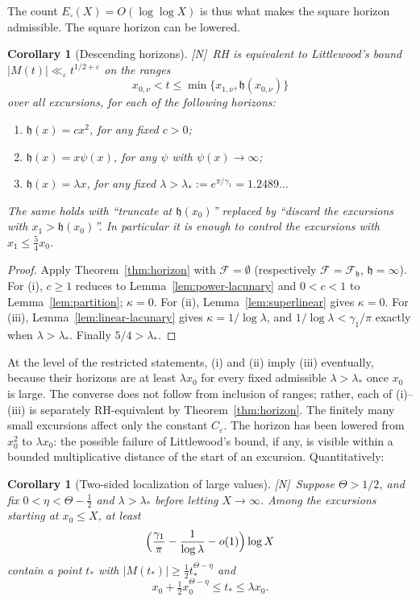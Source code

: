 \documentclass[11pt]{amsart}
\numberwithin{equation}{section}
\theoremstyle{plain}
\newtheorem{corollary}[theorem]{Corollary}
\theoremstyle{definition}
\theoremstyle{remark}
\newcommand{\eps}{\varepsilon}
\newcommand{\F}{\mathcal{F}}
\newcommand{\tagN}{\textup{[N]}}
\begin{document}
The count $E_\square(X)=O(\log\log X)$ is thus what makes the square
horizon admissible. The square horizon can be lowered.

\begin{corollary}[Descending horizons]
\label{cor:descending}
\tagN\ RH is equivalent to Littlewood's bound
$|M(t)|\ll_\eps t^{1/2+\eps}$ on the ranges
\[
x_{0,\nu}<t\le\min\{x_{1,\nu},\mathfrak h(x_{0,\nu})\}
\]
over all excursions, for each of the following horizons:
\begin{enumerate}[label=\textup{(\roman*)}]
\item $\mathfrak h(x)=cx^2$, for any fixed $c>0$;
\item $\mathfrak h(x)=x\psi(x)$, for any $\psi$ with $\psi(x)\to\infty$;
\item $\mathfrak h(x)=\lambda x$, for any fixed $\lambda>\lambda_*:=e^{\pi/\gamma_1}=1.2489\ldots$
\end{enumerate}
The same holds with ``truncate at $\mathfrak h(x_0)$'' replaced by ``discard the
excursions with $x_1>\mathfrak h(x_0)$''. In particular it is enough to control the
excursions with $x_1\le\frac54x_0$.
\end{corollary}

\begin{proof}
Apply Theorem~\ref{thm:horizon} with $\F=\emptyset$ (respectively
$\F=\F_{\mathfrak h}$, $\mathfrak h=\infty$). For (i), $c\ge1$ reduces to
Lemma~\ref{lem:power-lacunary} and $0<c<1$ to Lemma~\ref{lem:partition};
$\kappa=0$. For (ii), Lemma~\ref{lem:superlinear} gives $\kappa=0$. For
(iii), Lemma~\ref{lem:linear-lacunary} gives $\kappa=1/\log\lambda$, and
$1/\log\lambda<\gamma_1/\pi$ exactly when $\lambda>\lambda_*$. Finally
$5/4>\lambda_*$.
\end{proof}

At the level of the restricted statements, (i) and (ii) imply (iii)
eventually, because their horizons are at least $\lambda x_0$ for every
fixed admissible $\lambda>\lambda_*$ once $x_0$ is large.  The converse
does not follow from inclusion of ranges; rather, each of (i)--(iii) is
separately RH-equivalent by Theorem~\ref{thm:horizon}.  The finitely many
small excursions affect only the constant $C_\eps$. The horizon has
been lowered from $x_0^2$ to $\lambda x_0$: the possible failure of
Littlewood's bound, if any, is visible within a bounded multiplicative
distance of the start of an excursion. Quantitatively:

\begin{corollary}[Two-sided localization of large values]
\label{cor:two-sided}
\tagN\ Suppose $\Theta>1/2$, and fix $0<\eta<\Theta-\frac12$ and
$\lambda>\lambda_*$ before letting $X\to\infty$.
Among the excursions starting at $x_0\le X$, at least
\[
\Bigl(\frac{\gamma_1}{\pi}-\frac1{\log\lambda}-o(1)\Bigr)\log X
\]
contain a point $t_*$ with $|M(t_*)|\ge\frac12t_*^{\Theta-\eta}$ and
\[
x_0+\tfrac12x_0^{\Theta-\eta}\le t_*\le\lambda x_0 .
\]
\end{corollary}
\end{document}
